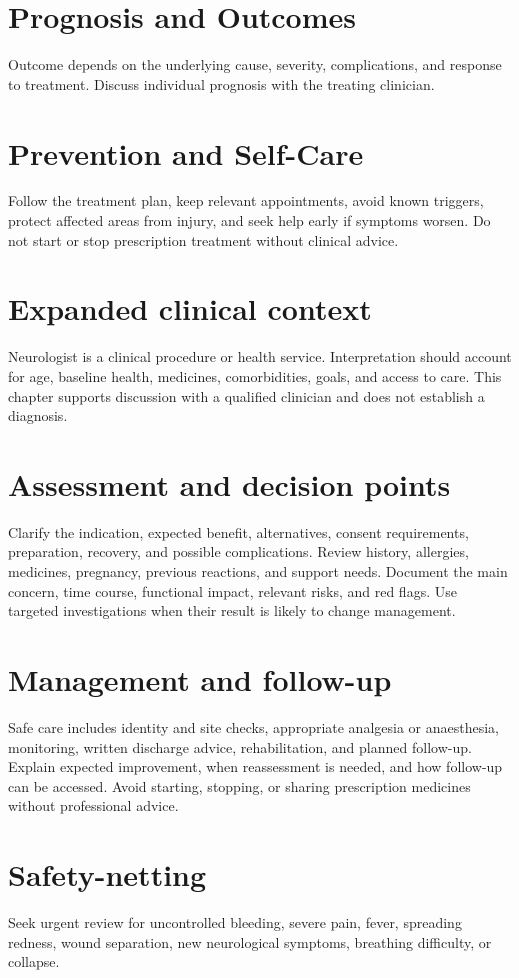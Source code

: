 \section*{Prognosis and Outcomes}
Outcome depends on the underlying cause, severity, complications, and response to treatment. Discuss individual prognosis with the treating clinician.

\section*{Prevention and Self-Care}
Follow the treatment plan, keep relevant appointments, avoid known triggers, protect affected areas from injury, and seek help early if symptoms worsen. Do not start or stop prescription treatment without clinical advice.

\section*{Expanded clinical context}
Neurologist is a clinical procedure or health service. Interpretation should account for age, baseline health, medicines, comorbidities, goals, and access to care. This chapter supports discussion with a qualified clinician and does not establish a diagnosis.

\section*{Assessment and decision points}
Clarify the indication, expected benefit, alternatives, consent requirements, preparation, recovery, and possible complications. Review history, allergies, medicines, pregnancy, previous reactions, and support needs. Document the main concern, time course, functional impact, relevant risks, and red flags. Use targeted investigations when their result is likely to change management.

\section*{Management and follow-up}
Safe care includes identity and site checks, appropriate analgesia or anaesthesia, monitoring, written discharge advice, rehabilitation, and planned follow-up. Explain expected improvement, when reassessment is needed, and how follow-up can be accessed. Avoid starting, stopping, or sharing prescription medicines without professional advice.

\section*{Safety-netting}
Seek urgent review for uncontrolled bleeding, severe pain, fever, spreading redness, wound separation, new neurological symptoms, breathing difficulty, or collapse.

